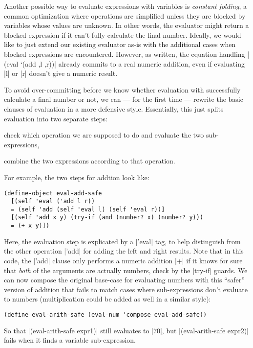 Another possible way to evaluate expressions with variables is \emph{constant folding}, a common optimization where operations are simplified unless they are blocked by variables whose values are unknown.
In other words, the evaluator might return a blocked expression if it can't fully calculate the final number.
Ideally, we would like to just extend our existing evaluator as-is with the additional cases when blocked expressions are encountered.
However, as written, the equation handling \scm|(eval `(add ,l ,r))| already commits to a real numeric addition, even if evaluating \scm|l| or \scm|r| doesn't give a numeric result.

To avoid over-committing before we know whether evaluation with successfully calculate a final number or not, we can --- for the first time --- rewrite the basic clauses of evaluation in a more defensive style.
Essentially, this just splits evaluation into two separate steps:
\begin{enumerate*}[(1)]
\item check which operation we are supposed to do and evaluate the two sub-expressions,
\item combine the two expressions according to that operation.
\end{enumerate*}
For example, the two steps for addtion look like:
\begin{verbatim} 
(define-object eval-add-safe
  [(self 'eval ('add l r))
  = (self 'add (self 'eval l) (self 'eval r))]
  [(self 'add x y) (try-if (and (number? x) (number? y)))
  = (+ x y)])
\end{verbatim}
Here, the evaluation step is explicated by a \scm|'eval| tag, to help distinguish from the other operation \scm|'add| for adding the left and right results.
Note that in this code, the \scm|'add| clause only performs a numeric addition \scm|+| if it knows for sure that \emph{both} of the arguments are actually numbers, check by the \scm|try-if| guards.
We can now compose the original base-case for evaluating numbers with this ``safer'' version of addition that fails to match cases where sub-expressions don't evaluate to numbers (multiplication could be added as well in a similar style):
\begin{verbatim}
(define eval-arith-safe (eval-num 'compose eval-add-safe))
\end{verbatim}
So that \scm|(eval-arith-safe expr1)| still evaluates to \scm|70|, but \scm|(eval-arith-safe expr2)| fails when it finds a variable sub-expression.

